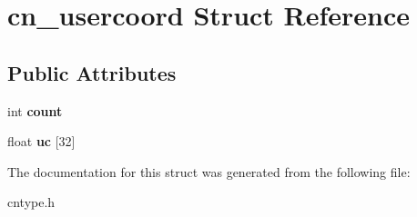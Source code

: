 \hypertarget{structcn__usercoord}{\section{cn\-\_\-usercoord Struct Reference}
\label{structcn__usercoord}
}
\subsection*{Public Attributes}
\begin{DoxyCompactItemize}
\item 
\hypertarget{structcn__usercoord_acd82acc824039a2eba1e24aabb4a7369}{int {\bfseries count}}\label{structcn__usercoord_acd82acc824039a2eba1e24aabb4a7369}

\item 
\hypertarget{structcn__usercoord_a216f89114dd62452c2cb439a2c52c3f9}{float {\bfseries uc} \mbox{[}32\mbox{]}}\label{structcn__usercoord_a216f89114dd62452c2cb439a2c52c3f9}

\end{DoxyCompactItemize}


The documentation for this struct was generated from the following file\-:\begin{DoxyCompactItemize}
\item 
cntype.\-h\end{DoxyCompactItemize}
